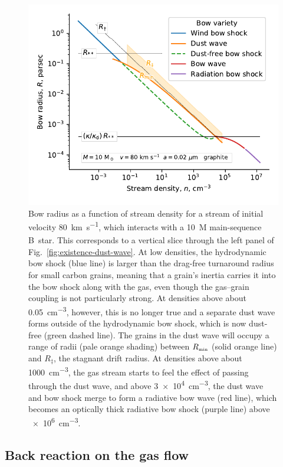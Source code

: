 \begin{figure}
  \includegraphics[width=\linewidth]{figs/onaxis-stats-plot-MS10-v080-gra002}
  \caption{Bow radius as a function of stream density for a stream of
    initial velocity \SI{80}{km.s^{-1}}, which interacts with a
    \SI{10}{M_\odot} main-sequence B~star.  This corresponds to a vertical
    slice through the left panel of
    Fig.~\ref{fig:existence-dust-wave}.  At low densities, the
    hydrodynamic bow shock (blue line) is larger than the drag-free
    turnaround radius for small carbon grains, meaning that a grain's
    inertia carries it into the bow shock along with the gas, even
    though the gas--grain coupling is not particularly strong.  At
    densities above about \SI{0.05}{cm^{-3}}, however, this is no
    longer true and a separate dust wave forms outside of the
    hydrodynamic bow shock, which is now dust-free (green dashed
    line).  The grains in the dust wave will occupy a range of radii
    (pale orange shading) between \(R_{\scriptscriptstyle\text{min}}\) (solid orange line) and
    \(R_\ddag\), the stagnant drift radius.  At densities above about
    \SI{1000}{cm^{-3}}, the gas stream starts to feel the effect of
    passing through the dust wave, and above \SI{3e4}{cm^{-3}}, the
    dust wave and bow shock merge to form a radiative bow wave (red
    line), which becomes an optically thick radiative bow shock
    (purple line) above \SI{e6}{cm^{-3}}.}
  \label{fig:decouple-vertical-cut}
\end{figure}

\subsection{Back reaction on the gas flow}
\label{sec:back-reaction-gas}

